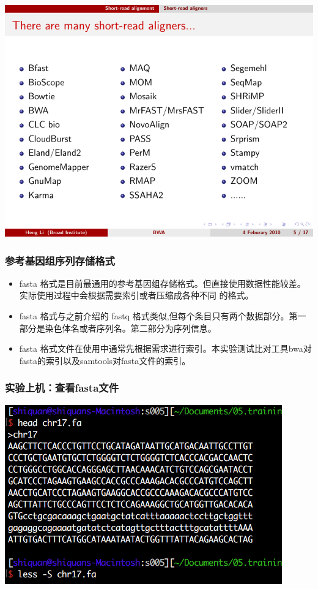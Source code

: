 \documentclass[12pt]{beamer}
\begin{document}
\begin{frame}
  \includegraphics[width=\textwidth]{figures/mapper.pdf}  
  \end{frame}
\begin{frame}\frametitle{参考基因组序列存储格式}
  \begin{itemize}
    \item fasta 格式是目前最通用的参考基因组存储格式。但直接使用数据性能较差。实际使用过程中会根据需要索引或者压缩成各种不同 的格式。
    \item fasta 格式与之前介绍的 fastq 格式类似,但每个条目只有两个数据部分。第一部分是染色体名或者序列名。第二部分为序列信息。
    \item fasta 格式文件在使用中通常先根据需求进行索引。本实验测试比对工具bwa对fasta的索引以及samtools对fasta文件的索引。
\end{itemize}


\end{frame}
\begin{frame}\frametitle{实验上机：查看fasta文件}
  \includegraphics[width=\textwidth]{figures/fasta_com.png}
\end{frame}
\end{document}
